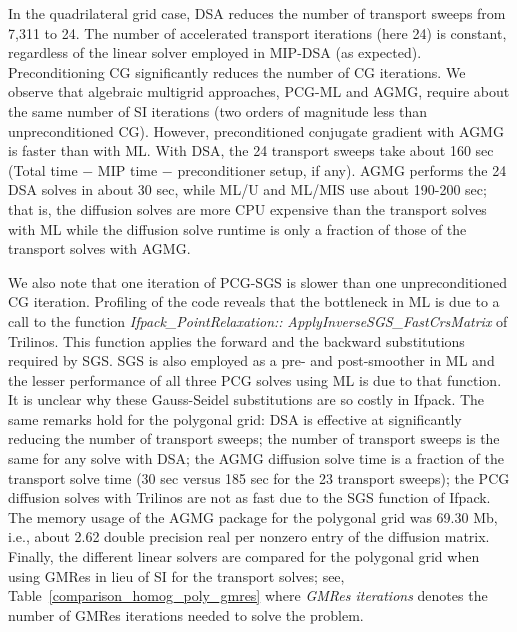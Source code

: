 \documentclass[preprint,10pt]{elsarticle}
\renewcommand{\(}{\left(}
\renewcommand{\)}{\right)}
\renewcommand{\[}{\left[}
\renewcommand{\]}{\right]}
\begin{document}
In the quadrilateral grid case, DSA reduces the number of transport sweeps from 7,311 to 24.
The number of accelerated transport iterations (here 24) is constant, regardless of the linear solver
employed in MIP-DSA (as expected). Preconditioning CG significantly reduces the number of CG iterations.
%
We observe that algebraic multigrid approaches, PCG-ML and AGMG, require 
about the same number of SI iterations (two orders of magnitude less than unpreconditioned CG). 
However, preconditioned conjugate gradient with AGMG is faster than with ML. 
With DSA, the 24 transport sweeps take about 160 sec (Total time $-$ MIP time $-$ preconditioner setup, if any). 
AGMG performs the 24 DSA solves in about 30 sec,
while ML/U and ML/MIS use about 190-200 sec; that is, the diffusion solves are more CPU expensive than the
transport solves with ML while the diffusion solve runtime is only a fraction of those of the transport solves with AGMG. 

We also note that one iteration of PCG-SGS is slower than one unpreconditioned CG iteration. Profiling of the code 
reveals that the bottleneck in ML is due to a call to the function \emph{Ifpack\_PointRelaxation::}
\emph{ApplyInverseSGS\_FastCrsMatrix} 
of Trilinos. This function applies the forward and the backward substitutions required by SGS.
SGS is also employed as a pre- and post-smoother in ML and the lesser performance of all three  
PCG solves using ML is due to that function. It is unclear why these Gauss-Seidel substitutions are so costly in Ifpack. 
%
The same remarks hold for the polygonal grid: DSA is effective at significantly reducing the number of transport sweeps; the number of transport sweeps is the same for any solve with DSA; the AGMG diffusion solve time is a fraction
of the transport solve time (30 sec versus 185 sec for the 23 transport sweeps); the PCG diffusion solves with Trilinos are not as fast due to the SGS function of Ifpack. The memory usage of the AGMG package for the polygonal grid was 69.30 Mb, i.e., about 2.62 double precision real per nonzero entry of the diffusion matrix.
%
Finally, the different linear solvers are compared for the polygonal grid
when using GMRes in lieu of SI for the transport solves; see, 
Table~\ref{comparison_homog_poly_gmres} where {\it GMRes iterations} denotes
the number of GMRes iterations needed to solve the problem. 
\end{document}
